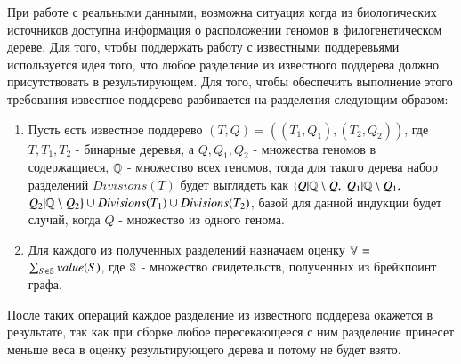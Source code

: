 При работе с реальными данными, возможна ситуация когда из биологических источников доступна информация о расположении геномов в филогенетическом дереве.
Для того, чтобы поддержать работу с известными поддеревьями используется идея того, что любое разделение из известного поддерева должно присутствовать в результирующем.
Для того, чтобы обеспечить выполнение этого требования известное поддерево разбивается на разделения следующим образом:
\begin{enumerate}
  \item Пусть есть известное поддерево $(T, Q) = ((T_1, Q_1), (T_2, Q_2))$, где $T, T_1, T_2$ - бинарные деревья,
    а $Q, Q_1, Q_2$ - множества геномов в содержащиеся, $\mathbb{Q}$ - множество всех геномов,
    тогда для такого дерева набор разделений $Divisions(T)$ будет выглядеть как
    $\{Q|\mathbb{Q} \setminus  Q,$ $Q_1|\mathbb{Q} \setminus Q_1,$ $Q_2|\mathbb{Q} \setminus Q_2\} \cup Divisions(T_1) \cup Divisions(T_2)$,
    базой для данной индукции будет случай, когда $Q$ - множество из одного генома.
  \item Для каждого из полученных разделений назначаем оценку $\mathbb{V}=$ \\
    $\sum\nolimits_{S \in \mathbb{S}} value(S)$, где $\mathbb{S}$ - множество свидетельств, полученных из брейкпоинт графа.
\end{enumerate}
После таких операций каждое разделение из известного поддерева окажется в результате, так как при сборке любое пересекающееся с ним разделение
принесет меньше веса в оценку результирующего дерева и потому не будет взято.
